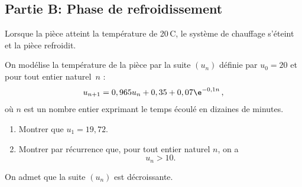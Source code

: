 	\subsection*{Partie B: Phase de refroidissement}
		Lorsque la pièce atteint la température de 20\,\textdegree{}C, le système de chauffage s'éteint et la pièce refroidit.

		On modélise la température de la pièce par la suite $(u_{n})$ définie par $u_{0}=20$ et pour tout entier naturel~$n$ :
		\[u_{n+1}=0,965 u_{n}+0,35+0,07 \e^{-0,1 n}\,,\]
		où $n$ est un nombre entier exprimant le temps écoulé en dizaines de minutes.

		\begin{enumerate}
			\item Montrer que \quad $u_{1}=19,72$.

			\item Montrer par récurrence que, pour tout entier naturel $n$, on a
			\[u_{n}>10.\]
		\end{enumerate}

		On admet que la suite $(u_{n})$ est décroissante.

